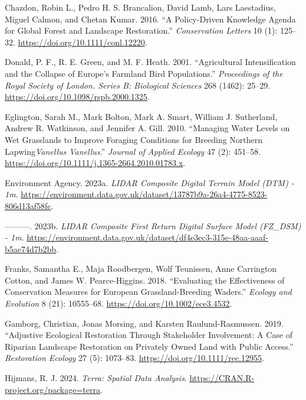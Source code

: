 \documentclass[
  12pt,
  letterpaper,
  DIV=11,
  numbers=noendperiod]{scrartcl}
\newlength{\cslhangindent}
\newenvironment{CSLReferences}[2] %
 {\begin{list}{}{%
  \setlength{\itemindent}{0pt}
  \setlength{\leftmargin}{0pt}
  \setlength{\parsep}{0pt}
  \ifodd #1
   \setlength{\leftmargin}{\cslhangindent}
   \setlength{\itemindent}{-1\cslhangindent}
  \fi
  \setlength{\itemsep}{#2\baselineskip}}}
 {\end{list}}
\begin{document}
\label{refs}
\begin{CSLReferences}{1}{0}
Chazdon, Robin L., Pedro H. S. Brancalion, David Lamb, Lars Laestadius,
Miguel Calmon, and Chetan Kumar. 2016. {``A Policy{-}Driven Knowledge
Agenda for Global Forest and Landscape Restoration.''}
\emph{Conservation Letters} 10 (1): 125--32.
\url{https://doi.org/10.1111/conl.12220}.

Donald, P. F., R. E. Green, and M. F. Heath. 2001. {``Agricultural
Intensification and the Collapse of Europe's Farmland Bird
Populations.''} \emph{Proceedings of the Royal Society of London. Series
B: Biological Sciences} 268 (1462): 25--29.
\url{https://doi.org/10.1098/rspb.2000.1325}.

Eglington, Sarah M., Mark Bolton, Mark A. Smart, William J. Sutherland,
Andrew R. Watkinson, and Jennifer A. Gill. 2010. {``Managing Water
Levels on Wet Grasslands to Improve Foraging Conditions for Breeding
Northern Lapwing{\emph{Vanellus Vanellus}}.''} \emph{Journal of Applied
Ecology} 47 (2): 451--58.
\url{https://doi.org/10.1111/j.1365-2664.2010.01783.x}.

Environment Agency. 2023a. \emph{LIDAR Composite Digital Terrain Model
(DTM) - 1m}.
\url{https://environment.data.gov.uk/dataset/13787b9a-26a4-4775-8523-806d13af58fc}.

---------. 2023b. \emph{LIDAR Composite First Return Digital Surface
Model (FZ\_DSM) - 1m}.
\url{https://environment.data.gov.uk/dataset/df4e3ec3-315e-48aa-aaaf-b5ae74d7b2bb}.

Franks, Samantha E., Maja Roodbergen, Wolf Teunissen, Anne Carrington
Cotton, and James W. Pearce-Higgins. 2018. {``Evaluating the
Effectiveness of Conservation Measures for European Grassland{-}Breeding
Waders.''} \emph{Ecology and Evolution} 8 (21): 10555--68.
\url{https://doi.org/10.1002/ece3.4532}.

Gamborg, Christian, Jonas Morsing, and Karsten Raulund-Rasmussen. 2019.
{``Adjustive Ecological Restoration Through Stakeholder Involvement: A
Case of Riparian Landscape Restoration on Privately Owned Land with
Public Access.''} \emph{Restoration Ecology} 27 (5): 1073--83.
\url{https://doi.org/10.1111/rec.12955}.

Hijmans, R. J. 2024. \emph{Terra: Spatial Data Analysis}.
\url{https://CRAN.R-project.org/package=terra}.


\end{CSLReferences}
\end{document}
